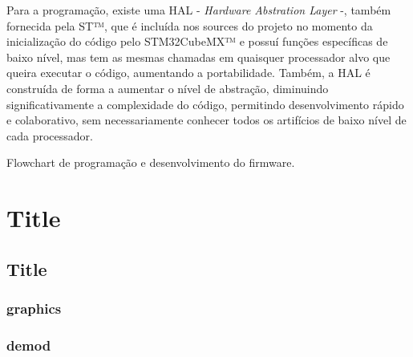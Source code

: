 \documentclass[10pt,a4paper]{report}
\begin{document}
	Para a programação, existe uma HAL - {\it Hardware Abstration Layer} -, também fornecida pela ST™, que é incluída nos sources do projeto no momento da inicialização do código pelo STM32CubeMX™ e possuí funções específicas de baixo nível, mas tem as mesmas chamadas em quaisquer processador alvo que queira executar o código, aumentando a portabilidade. Também, a HAL é construída de forma a aumentar o nível de abstração, diminuindo significativamente a complexidade do código, permitindo desenvolvimento rápido e colaborativo, sem necessariamente conhecer todos os artifícios de baixo nível de cada processador.
	\begin{center}
		\vspace{0.1cm}
	\footnotesize{Flowchart de programação e desenvolvimento do firmware.}
	\end{center}

\chapter{Title}
	\section{Title}
	\subsection{graphics}
	
	
	\subsection{demod}
	
\end{document}
